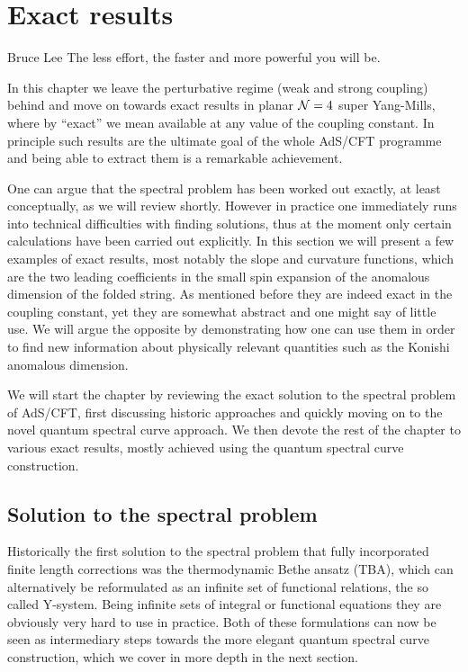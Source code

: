 
\section{Exact results}
\label{sec:exact_results}

\begin{chapquote}{Bruce Lee}
The less effort, the faster and more powerful you will be.
\end{chapquote}

\noindent In this chapter we leave the perturbative regime (weak and strong coupling) behind and move on towards exact results in planar $\mathcal{N}=4$ super Yang-Mills, where by ``exact'' we mean available at any value of the coupling constant.
In principle such results are the ultimate goal of the whole AdS/CFT programme and being able to extract them is a remarkable achievement.

One can argue that the spectral problem has been worked out exactly, at least conceptually, as we will review shortly.
However in practice one immediately runs into technical difficulties with finding solutions, thus at the moment only certain calculations have been carried out explicitly.
In this section we will present a few examples of exact results, most notably the slope and curvature functions, which are the two leading coefficients in the small spin expansion of the anomalous dimension of the folded string.
As mentioned before they are indeed exact in the coupling constant, yet they are somewhat abstract and one might say of little use.
We will argue the opposite by demonstrating how one can use them in order to find new information about physically relevant quantities such as the Konishi anomalous dimension.

We will start the chapter by reviewing the exact solution to the spectral problem of AdS/CFT, first discussing historic approaches and quickly moving on to the novel quantum spectral curve approach.
We then devote the rest of the chapter to various exact results, mostly achieved using the quantum spectral curve construction.


\subsection{Solution to the spectral problem}
\label{sec:tba_y_system}

Historically the first solution to the spectral problem that fully incorporated finite length corrections was the thermodynamic Bethe ansatz (TBA), which can alternatively be reformulated as an infinite set of functional relations, the so called Y-system.
Being infinite sets of integral or functional equations they are obviously very hard to use in practice.
Both of these formulations can now be seen as intermediary steps towards the more elegant quantum spectral curve construction, which we cover in more depth in the next section.

